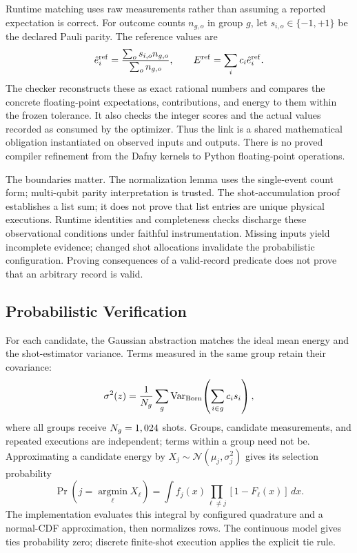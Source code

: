 \documentclass[conference]{IEEEtran}
\begin{document}
Runtime matching uses raw measurements rather than assuming a reported expectation is correct. For outcome counts $n_{g,o}$ in group $g$, let $s_{i,o}\in\{-1,+1\}$ be the declared Pauli parity. The reference values are
\begin{equation}
 \hat e_i^{\rm ref}=\frac{\sum_o s_{i,o}n_{g,o}}{\sum_o n_{g,o}},
 \qquad E^{\rm ref}=\sum_i c_i\hat e_i^{\rm ref}.
 \label{eq:runtime-reference}
\end{equation}
The checker reconstructs these as exact rational numbers and compares the concrete floating-point expectations, contributions, and energy to them within the frozen tolerance. It also checks the integer scores and the actual values recorded as consumed by the optimizer. Thus the link is a shared mathematical obligation instantiated on observed inputs and outputs. There is no proved compiler refinement from the Dafny kernels to Python floating-point operations.

The boundaries matter. The normalization lemma uses the single-event count form; multi-qubit parity interpretation is trusted. The shot-accumulation proof establishes a list sum; it does not prove that list entries are unique physical executions. Runtime identities and completeness checks discharge these observational conditions under faithful instrumentation. Missing inputs yield incomplete evidence; changed shot allocations invalidate the probabilistic configuration. Proving consequences of a valid-record predicate does not prove that an arbitrary record is valid.

\subsection{Probabilistic Verification}
\label{sec:probabilistic}
For each candidate, the Gaussian abstraction matches the ideal mean energy and the shot-estimator variance. Terms measured in the same group retain their covariance:
\begin{equation}
 \sigma^2(z)=\frac{1}{N_g}\sum_g
 \operatorname{Var}_{\rm Born}\!\left(\sum_{i\in g}c_i s_i\right),
 \label{eq:variance}
\end{equation}
where all groups receive $N_g=1,024$ shots. Groups, candidate measurements, and repeated executions are independent; terms within a group need not be. Approximating a candidate energy by $X_j\sim\mathcal N(\mu_j,\sigma_j^2)$ gives its selection probability
\begin{equation}
 \Pr(j=\operatorname*{argmin}_\ell X_\ell)
 =\int f_j(x)\prod_{\ell\ne j}[1-F_\ell(x)]\,dx.
 \label{eq:selection}
\end{equation}
The implementation evaluates this integral by configured quadrature and a normal-CDF approximation, then normalizes rows. The continuous model gives ties probability zero; discrete finite-shot execution applies the explicit tie rule.
\end{document}
